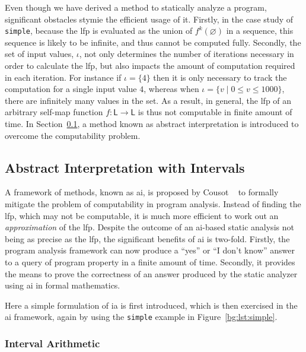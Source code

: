 Even though we have derived a method to statically analyze a program,
significant obstacles stymie the efficient usage of it.  Firstly, in the case
study of \verb|simple|, because the \gls{lfp} is evaluated as the union of
$f^k(\varnothing)$ in a sequence, this sequence is likely to be infinite, and
thus cannot be computed fully.  Secondly, the set of input values, $\iota$,
not only determines the number of iterations necessary in order to calculate
the \gls{lfp}, but also impacts the amount of computation required in each
iteration.  For instance if $\iota = \{4\}$ then it is only necessary to
track the computation for a single input value $4$, whereas when $\iota = \{
v \mid 0 \leq v \leq 1000 \}$, there are infinitely many values in the set.
As a result, in general, the \gls{lfp} of an arbitrary self-map function $f:
\mathsf{L} \to \mathsf{L}$ is thus not computable in finite amount of time.  In
Section~\ref{bg:sub:intervals}, a method known as abstract interpretation is
introduced to overcome the computability problem.


\subsection{Abstract Interpretation with Intervals}
\label{bg:sub:intervals}

A framework of methods, known as \gls{ai}, is proposed by Cousot
\etal~\cite{cousot77} to formally mitigate the problem of computability
in program analysis.  Instead of finding the \gls{lfp}, which may not be
computable, it is much more efficient to work out an \emph{approximation} of
the \gls{lfp}\@.  Despite the outcome of an \gls{ai}-based static analysis not
being as precise as the \gls{lfp}, the significant benefits of \gls{ai} is
two-fold.  Firstly, the program analysis framework can now produce a ``yes'' or
``I don't know'' answer to a query of program property in a finite amount of
time.  Secondly, it provides the means to prove the correctness of an answer
produced by the static analyzer using \gls{ai} in formal mathematics.

Here a simple formulation of \acrlong{ia} is first introduced, which is then
exercised in the \gls{ai} framework, again by using the \verb|simple| example
in Figure~\ref{bg:lst:simple}.

\subsubsection{Interval Arithmetic}
\label{bg:ssub:interval}

